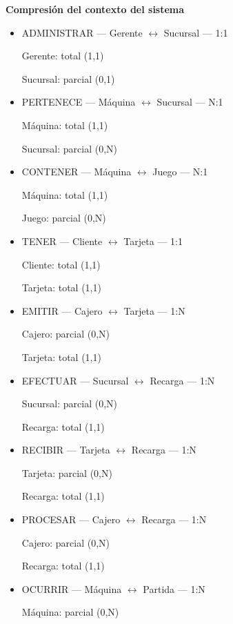 \item \textbf{Compresión del contexto del sistema}

\begin{itemize}

	\item ADMINISTRAR — Gerente $\leftrightarrow$ Sucursal — 1:1

	      Gerente: total (1,1)

	      Sucursal: parcial (0,1)

	\item PERTENECE — Máquina $\leftrightarrow$ Sucursal — N:1

	      Máquina: total (1,1)

	      Sucursal: parcial (0,N)

	\item CONTENER — Máquina $\leftrightarrow$ Juego — N:1

	      Máquina: total (1,1)

	      Juego: parcial (0,N)


	\item TENER — Cliente $\leftrightarrow$ Tarjeta — 1:1

	      Cliente: total (1,1)

	      Tarjeta: total (1,1)

	\item EMITIR — Cajero $\leftrightarrow$ Tarjeta — 1:N

	      Cajero: parcial (0,N)

	      Tarjeta: total (1,1)

	\item EFECTUAR — Sucursal $\leftrightarrow$ Recarga — 1:N

	      Sucursal: parcial (0,N)

	      Recarga: total (1,1)

	\item RECIBIR — Tarjeta $\leftrightarrow$ Recarga — 1:N

	      Tarjeta: parcial (0,N)

	      Recarga: total (1,1)

	\item PROCESAR — Cajero $\leftrightarrow$ Recarga — 1:N

	      Cajero: parcial (0,N)

	      Recarga: total (1,1)

	\item OCURRIR — Máquina $\leftrightarrow$ Partida — 1:N

	      Máquina: parcial (0,N)


\end{itemize}
